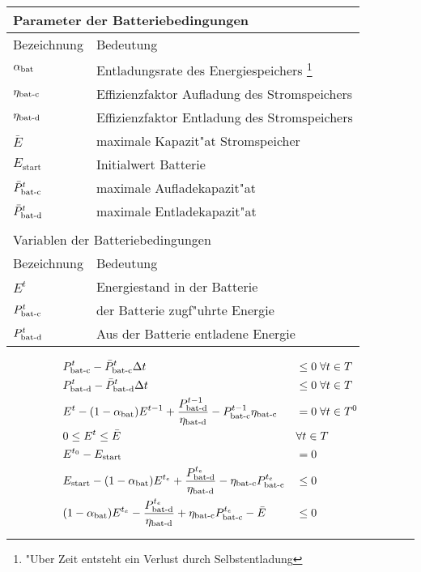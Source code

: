 \begin{tabular}{l l}
\multicolumn{2}{l}{Parameter der Batteriebedingungen}\\
\hline
Bezeichnung & Bedeutung \\
\hline
$\alpha_{\text{bat}}$ & Entladungsrate des Energiespeichers \footnote{"Uber Zeit entsteht ein Verlust durch Selbstentladung} \\
$\eta_{\text{bat-c}}$ & Effizienzfaktor Aufladung des Stromspeichers  \\
$\eta_{\text{bat-d}}$ & Effizienzfaktor Entladung des Stromspeichers  \\
$\bar E$ & maximale Kapazit"at Stromspeicher \\
$E_{\text{start}}$& Initialwert Batterie \\
$\bar P^t_{\text{bat-c}}$ & maximale Aufladekapazit"at \\
$\bar P^t_{\text{bat-d}}$ & maximale Entladekapazit"at \\\\
\multicolumn{2}{l}{Variablen der Batteriebedingungen}\\
\hline
Bezeichnung & Bedeutung \\
\hline
$E^t$ & Energiestand in der Batterie \\
$P^t_{\text{bat-c}}$ & der Batterie zugf"uhrte Energie \\
$P^t_{\text{bat-d}}$ & Aus der Batterie entladene Energie \\
\end{tabular}


\begin{align}
& P^t_{\text{bat-c}} - \bar P^t_{\text{bat-c}} \Delta t && \leq 0 \; \forall	 t \in T \label{pbatcup} \\
& P^t_{\text{bat-d}} - \bar P^t_{\text{bat-d}} \Delta t && \leq 0 \; \forall	 t \in T \label{pbatdup} \\
& E^t - (1-\alpha_{\text{bat}}) E^{t-1} + \frac{P^{t-1}_{\text{bat-d}}}{\eta_{\text{bat-d}}} - P^{t-1}_{\text{bat-c}} \eta_{\text{bat-c}} &&= 0 \; \forall t \in T^0 \label{batbal} \\
& 0 \leq E^t \leq \bar E && \forall t \in T \label{Ebd}\\
& E^{t_0} - E_\text{start} &&= 0 \label{initbat}\\
& E_\text{start} - (1-\alpha_{\text{bat}}) E^{t_e} + \frac{P^{t_e}_{\text{bat-d}}}{\eta_{\text{bat-d}}} -\eta_{\text{bat-c}} P^{t_e}_{\text{bat-c}}   &&\leq 0 \label{battermlo}\\
& (1-\alpha_{\text{bat}}) E^{t_e} - \frac{P^{t_e}_{\text{bat-d}}}{\eta_{\text{bat-d}}} + \eta_{\text{bat-c}} P^{t_e}_{\text{bat-c}}  - \bar E  &&\leq 0 \label{battermup}
\end{align}

